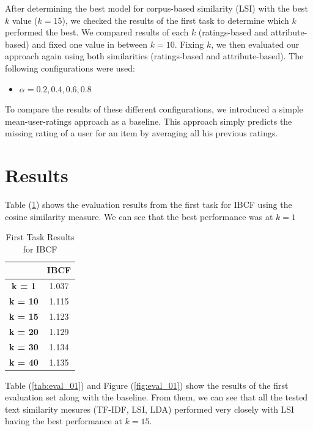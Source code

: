 \documentclass{sigish}
\begin{document}
After determining the best model for corpus-based similarity (LSI) with the best $ k $ value ($ k = 15 $), we checked the results of the first task to determine which $ k $ performed the best. We compared results of each $ k $ (ratings-based and attribute-based) and fixed one value in between $ k=10 $. Fixing $ k $, we then evaluated our approach again using both similarities (ratings-based and attribute-based). The following configurations were used:
\begin{itemize}
\item $ \alpha = {0.2, 0.4, 0.6, 0.8} $
\end{itemize}

To compare the results of these different configurations, we introduced a simple mean-user-ratings approach as a baseline. This approach simply predicts the missing rating of a user for an item by averaging all his previous ratings.

\section{Results}

Table (\ref{tab:eval_00}) shows the evaluation results from the first task for IBCF using the cosine similarity measure. We can see that the best performance was at $ k = 1 $

\begin{table}[]
\centering
\begin{tabular}{|c|c|}
\hline
                & \textbf{IBCF} \\ \hline
\textbf{k = 1}  & 1.037         \\ \hline
\textbf{k = 10} & 1.115         \\ \hline
\textbf{k = 15} & 1.123         \\ \hline
\textbf{k = 20} & 1.129         \\ \hline
\textbf{k = 30} & 1.134         \\ \hline
\textbf{k = 40} & 1.135         \\ \hline
\end{tabular}
\caption{First Task Results for IBCF}
\label{tab:eval_00}
\end{table}

Table (\ref{tab:eval_01}) and Figure (\ref{fig:eval_01}) show the results of the first evaluation set along with the baseline. From them, we can see that all the tested text similarity mesures (TF-IDF, LSI, LDA) performed very closely with LSI having the best performance at $ k = 15 $.
\end{document}
